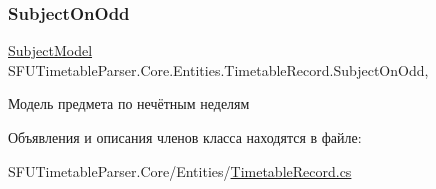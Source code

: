 \subsubsection{\texorpdfstring{Subject\+On\+Odd}{SubjectOnOdd}}
{\footnotesize\ttfamily \hyperlink{class_s_f_u_timetable_parser_1_1_core_1_1_entities_1_1_subject_model}{Subject\+Model} S\+F\+U\+Timetable\+Parser.\+Core.\+Entities.\+Timetable\+Record.\+Subject\+On\+Odd\hspace{0.3cm}{\ttfamily [get]}, {\ttfamily [set]}}



Модель предмета по нечётным неделям 



Объявления и описания членов класса находятся в файле\+:\begin{DoxyCompactItemize}
\item 
S\+F\+U\+Timetable\+Parser.\+Core/\+Entities/\hyperlink{_timetable_record_8cs}{Timetable\+Record.\+cs}\end{DoxyCompactItemize}
